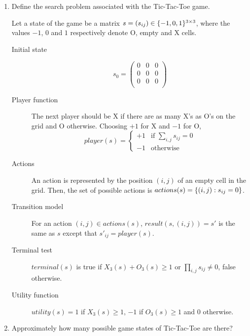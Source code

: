 \documentclass[11pt, a4paper]{article}
\begin{document}
\begin{enumerate}
    \item Define the search problem associated with the Tic-Tac-Toe game.

    \begin{solution}
        Let a state of the game be a matrix $s = (s_{ij}) \in \{-1, 0, 1\}^{3 \times 3}$, where the values $-1$, $0$ and $1$ respectively denote O, empty and X cells.
        \begin{description}
            \item[Initial state]
            \begin{equation*}
                s_0 = \begin{pmatrix} 0 & 0 & 0 \\ 0 & 0 & 0 \\ 0 & 0 & 0 \\ \end{pmatrix}
            \end{equation*}
            \item[Player function] The next player should be X if there are as many X's as O's on the grid and O otherwise. Choosing $+1$ for X and $-1$ for O,
            \begin{equation*}
                player(s) = \begin{cases}
                    +1 & \text{if } \sum_{i, j} s_{ij} = 0 \\
                    -1 & \text{otherwise}
                \end{cases}
            \end{equation*}
            \item[Actions] An action is represented by the position $(i, j)$ of an empty cell in the grid. Then, the set of possible actions is $actions(s) = \{(i, j): s_{ij} = 0\}$.
            \item[Transition model] For an action $(i, j) \in actions(s)$, $result(s, (i, j)) = s'$ is the same as $s$ except that $s'_{ij} = player(s)$.
            \item[Terminal test] $terminal(s)$ is true if $X_3(s) + O_3(s) \geq 1$ or $\prod_{i,j} s_{ij} \neq 0$, false otherwise.
            \item[Utility function] $utility(s) = 1$ if $X_3(s) \geq 1$, $-1$ if $O_3(s) \geq 1$ and $0$ otherwise.
        \end{description}
    \end{solution}

    \item Approximately how many possible game states of Tic-Tac-Toe are there?


\end{enumerate}
\end{document}
